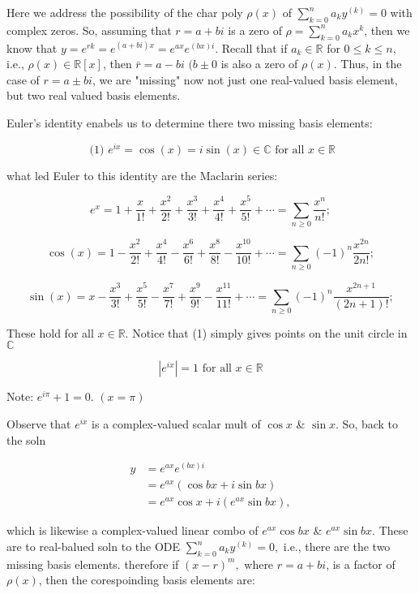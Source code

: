\documentclass[12pt,a4paper]{article}
\theoremstyle{definition}
\begin{document}
Here we address the possibility of the char poly \( \rho(x) \) of \(
\sum_{k=0}^{n} a_ky^{(k)} = 0  \) with complex zeros. So, assuming that
\( r = a + bi \) is a zero of \( \rho = \sum_{k=0}^{n} a_k x^k \), then
we know that \( y= e^{rk} = e^{(a+bi)x} = e^{ax} e^{(bx)i}\). Recall
that if \( a_k \in \mathbb{R} \) for \( 0 \leq k \leq n \), i.e., \(
\rho(x) \in \mathbb{R}[x] \), then \( \bar{r} = a-bi\) \( (b \pm 0 \) is
also a zero of \( \rho(x) \). Thus, in the case of \( r = a \pm bi \),
we are "missing" now not just one real-valued basis element, but two
real valued basis elements. 

Euler's identity enabels us to determine there two missing basis
elements: 

\[ \text{ (1) } e^{ix} = \cos(x) = i\sin(x) \in \mathbb{C} \text{ for all } x \in
\mathbb{R} \]

what led Euler to this identity are the Maclarin series: 

\[ e^x = 1 + \frac{x}{1!} + \frac{x^2}{2!} + \frac{x^3}{3!}+
\frac{x^4}{4!}+ \frac{x^5}{5!} + \cdots = \sum_{n \geq 0} \frac{x^n}{n!};\]

\[ \cos(x) = 1 - \frac{x^2}{2!} +
\frac{x^4}{4!} - \frac{x^6}{6!} + \frac{x^8}{8!} - \frac{x^10}{10!} +
\cdots = \sum_{n \geq 0} (-1)^n \frac{x^{2n}}{2n!};\]

\[ \sin(x) =  x -  \frac{x^3}{3!} + \frac{x^5}{5!} - \frac{x^7}{7!} +
\frac{x^9}{9!} - \frac{x^11}{11!} + \cdots = \sum_{n \geq 0} (-1)^n
\frac{x^{2n +1}}{(2n+1)!};\]

These hold for all \( x \in \mathbb{R} \). Notice that (1) simply gives
points on the unit circle in \( \mathbb{C} \)

\[ |e^{ix}| = 1 \text{ for all } x \in \mathbb{R} \]

Note: \( e^{i \pi} + 1 = 0. \) \( (x = \pi) \)

Observe that \( e^{ix} \) is a complex-valued scalar mult of \( \cos x
\) \& \( \sin x \). So, back to the soln

\begin{align*}
  y &= e^{ax} e^{(bx)i} \\
  &=e^{ax}(\cos bx + i \sin bx) \\
  &= e^{ax} \cos x + i(e^{ax} \sin bx),
\end{align*}

which is likewise a complex-valued linear combo of \( e^{ax} \cos bx \) \& \(
e^{ax} \sin bx \). These are to real-balued soln to the ODE \(
\sum_{k=0}^{n}a_ky^{(k)} =0, \) i.e., there are the two missing basis
elements. therefore if \( (x-r)^m, \) where \( r = a +bi \), is a factor
of \( \rho(x) \), then the corespoinding basis elements are: 
\end{document}

